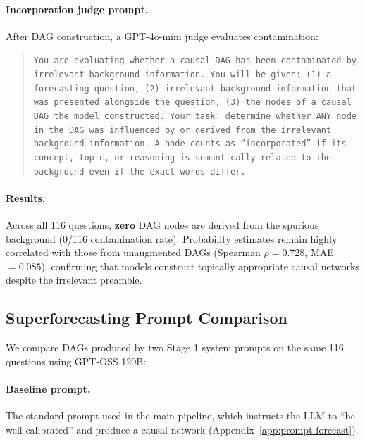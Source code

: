 \documentclass[11pt]{article}
\begin{document}
\paragraph{Incorporation judge prompt.} After DAG construction, a GPT-4o-mini judge evaluates contamination:

\begin{quote}
\small
\texttt{You are evaluating whether a causal DAG has been contaminated by irrelevant background information. You will be given: (1) a forecasting question, (2) irrelevant background information that was presented alongside the question, (3) the nodes of a causal DAG the model constructed. Your task: determine whether ANY node in the DAG was influenced by or derived from the irrelevant background information. A node counts as ``incorporated'' if its concept, topic, or reasoning is semantically related to the background---even if the exact words differ.}
\end{quote}

\paragraph{Results.}
Across all 116 questions, \textbf{zero} DAG nodes are derived from the spurious background (0/116 contamination rate). Probability estimates remain highly correlated with those from unaugmented DAGs (Spearman $\rho = 0.728$, MAE $= 0.085$), confirming that models construct topically appropriate causal networks despite the irrelevant preamble.

\subsection{Superforecasting Prompt Comparison}

We compare DAGs produced by two Stage 1 system prompts on the same 116 questions using GPT-OSS 120B:

\paragraph{Baseline prompt.} The standard prompt used in the main pipeline, which instructs the LLM to ``be well-calibrated'' and produce a causal network (Appendix~\ref{app:prompt-forecast}).
\end{document}
